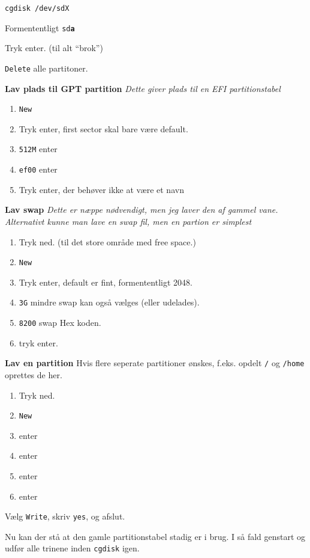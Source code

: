 \documentclass[10pt,a4paper,danish]{article}
\begin{document}
\begin{verbatim}
cgdisk /dev/sdX
\end{verbatim}

Formententligt \texttt{sd\textbf{a}}

Tryk enter. (til alt ``brok'')

\texttt{Delete} alle partitoner.

\textbf{Lav plads til GPT partition}
\textit{Dette giver plads til en EFI partitionstabel}\
\begin{enumerate}
\item \texttt{New}
\item Tryk enter, first sector skal bare  være default.
\item \texttt{512M} enter
\item \texttt{ef00} enter
\item Tryk enter, der behøver ikke at være et navn
\end{enumerate}

\textbf{Lav swap}
\textit{Dette er næppe nødvendigt, men jeg laver den af gammel vane. Alternativt
  kunne man lave en swap fil, men en partion er simplest}
\begin{enumerate}
\item Tryk ned. (til det store område med free space.)
\item \texttt{New}
\item Tryk enter, default er fint, formententligt 2048.
\item \texttt{3G} mindre swap kan også vælges (eller udelades).
\item \texttt{8200} swap Hex koden.
\item tryk enter.
\end{enumerate}

\textbf{Lav en partition}
Hvis flere seperate partitioner ønskes, f.eks. opdelt \texttt{/} og
\texttt{/home} oprettes de her.
\begin{enumerate}
\item Tryk ned.
\item \texttt{New}
\item enter
\item enter
\item enter
\item enter
\end{enumerate}

Vælg \texttt{Write}, skriv \texttt{yes}, og afslut.

Nu kan der stå at den gamle partitionstabel stadig er i brug. I så fald genstart og udfør alle trinene inden \texttt{cgdisk} igen.
\end{document}
